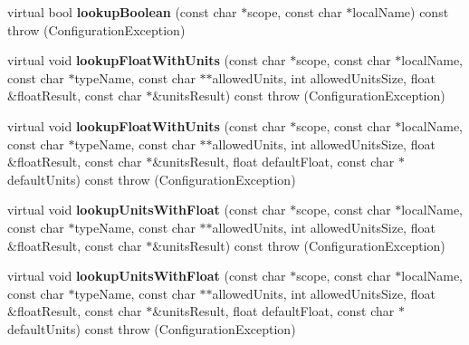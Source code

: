 \begin{DoxyCompactItemize}
\item 
\hypertarget{classCONFIG4CPP__NAMESPACE_1_1ConfigurationImpl_ab7d2126b2e3d15ffa44debac5645007a}{virtual bool {\bfseries lookup\-Boolean} (const char $\ast$scope, const char $\ast$local\-Name) const   throw (\-Configuration\-Exception)}\label{classCONFIG4CPP__NAMESPACE_1_1ConfigurationImpl_ab7d2126b2e3d15ffa44debac5645007a}

\item 
\hypertarget{classCONFIG4CPP__NAMESPACE_1_1ConfigurationImpl_aeb23956ebc6a192bd6e8fe589017f89b}{virtual void {\bfseries lookup\-Float\-With\-Units} (const char $\ast$scope, const char $\ast$local\-Name, const char $\ast$type\-Name, const char $\ast$$\ast$allowed\-Units, int allowed\-Units\-Size, float \&float\-Result, const char $\ast$\&units\-Result) const   throw (\-Configuration\-Exception)}\label{classCONFIG4CPP__NAMESPACE_1_1ConfigurationImpl_aeb23956ebc6a192bd6e8fe589017f89b}

\item 
\hypertarget{classCONFIG4CPP__NAMESPACE_1_1ConfigurationImpl_aaae40162aa6226242265bb38129ed859}{virtual void {\bfseries lookup\-Float\-With\-Units} (const char $\ast$scope, const char $\ast$local\-Name, const char $\ast$type\-Name, const char $\ast$$\ast$allowed\-Units, int allowed\-Units\-Size, float \&float\-Result, const char $\ast$\&units\-Result, float default\-Float, const char $\ast$default\-Units) const   throw (\-Configuration\-Exception)}\label{classCONFIG4CPP__NAMESPACE_1_1ConfigurationImpl_aaae40162aa6226242265bb38129ed859}

\item 
\hypertarget{classCONFIG4CPP__NAMESPACE_1_1ConfigurationImpl_a5b64e97c921fd60a38b520ef929c991a}{virtual void {\bfseries lookup\-Units\-With\-Float} (const char $\ast$scope, const char $\ast$local\-Name, const char $\ast$type\-Name, const char $\ast$$\ast$allowed\-Units, int allowed\-Units\-Size, float \&float\-Result, const char $\ast$\&units\-Result) const   throw (\-Configuration\-Exception)}\label{classCONFIG4CPP__NAMESPACE_1_1ConfigurationImpl_a5b64e97c921fd60a38b520ef929c991a}

\item 
\hypertarget{classCONFIG4CPP__NAMESPACE_1_1ConfigurationImpl_a40bb9a8862e9715a98c3d1dbe9eb52b4}{virtual void {\bfseries lookup\-Units\-With\-Float} (const char $\ast$scope, const char $\ast$local\-Name, const char $\ast$type\-Name, const char $\ast$$\ast$allowed\-Units, int allowed\-Units\-Size, float \&float\-Result, const char $\ast$\&units\-Result, float default\-Float, const char $\ast$default\-Units) const   throw (\-Configuration\-Exception)}\label{classCONFIG4CPP__NAMESPACE_1_1ConfigurationImpl_a40bb9a8862e9715a98c3d1dbe9eb52b4}


\end{DoxyCompactItemize}
